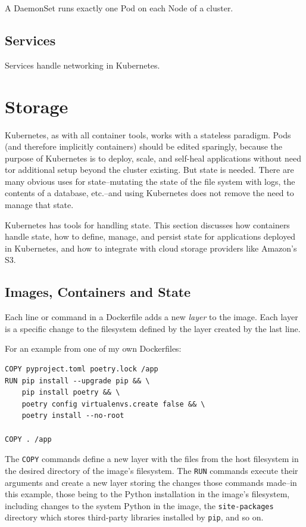 \documentclass[11pt, a4paper]{article}
\begin{document}
A DaemonSet runs exactly one Pod on each Node of a cluster.

\subsection{Services}

Services handle networking in Kubernetes.

\section{Storage}

Kubernetes, as with all container tools, works with a stateless paradigm. Pods (and therefore implicitly containers) should be edited sparingly, because the purpose of Kubernetes is to deploy, scale, and self-heal applications without need tor additional setup beyond the cluster existing. But state is needed. There are many obvious uses for state--mutating the state of the file system with logs, the contents of a database, etc.--and using Kubernetes does not remove the need to manage that state.

Kubernetes has tools for handling state. This section discusses how containers handle state, how to define, manage, and persist state for applications deployed in Kubernetes, and how to integrate with cloud storage providers like Amazon's S3. 

\subsection{Images, Containers and State}

Each line or command in a Dockerfile adds a new \textit{layer} to the image. Each layer is a specific change to the filesystem defined by the layer created by the last line. 

For an example from one of my own Dockerfiles:

\begin{lstlisting}
COPY pyproject.toml poetry.lock /app
RUN pip install --upgrade pip && \
    pip install poetry && \
    poetry config virtualenvs.create false && \
    poetry install --no-root

COPY . /app
\end{lstlisting}

The \texttt{COPY} commands define a new layer with the files from the host filesystem in the desired directory of the image's filesystem. The \texttt{RUN} commands execute their arguments and create a new layer storing the changes those commands made--in this example, those being to the Python installation in the image's filesystem, including changes to the system Python in the image, the \texttt{site-packages} directory which stores third-party libraries installed by \texttt{pip}, and so on.
\end{document}
